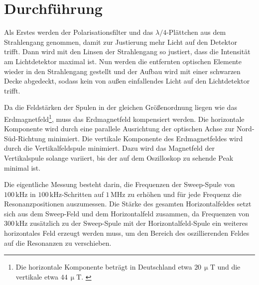 \section{Durchführung}
Als Erstes werden der Polarisationsfilter und das $\lambda/4$-Plättchen aus dem Strahlengang genommen, damit zur Justierung mehr Licht auf den Detektor trifft.
Dann wird mit den Linsen der Strahlengang so justiert, dass die Intensität am Lichtdetektor maximal ist.
Nun werden die entfernten optischen Elemente wieder in den Strahlengang gestellt und der
Aufbau wird mit einer schwarzen Decke abgedeckt, sodass kein von außen
einfallendes Licht auf den Lichtdetektor trifft.

Da die Feldstärken der Spulen in der gleichen Größenordnung liegen wie das
Erdmagnetfeld\footnote{Die horizontale Komponente beträgt in Deutschland etwa
 $20\,\upmu\text{T}$ und die vertikale etwa $44\,\upmu\text{T}$. \cite{erdmagnetfeld}},
 muss das Erdmagnetfeld kompensiert werden. Die horizontale Komponente
 wird durch eine parallele Ausrichtung der optischen Achse zur Nord-Süd-Richtung minimiert.
 Die vertikale Komponente des Erdmagnetfeldes wird durch die Vertikalfeldspule minimiert.
 Dazu wird das Magnetfeld der Vertikalspule solange variiert, bis der auf dem Oszilloskop zu sehende Peak minimal ist.

 Die eigentliche Messung besteht darin, die Frequenzen der Sweep-Spule von  $100\,\text{kHz}$ in $100\,\text{kHz}$-Schritten auf $1\,\text{MHz}$ zu
 erhöhen und für jede Frequenz die Resonanzpositionen auszumessen.
 Die Stärke des gesamten Horizontalfeldes setzt sich aus dem Sweep-Feld und dem Horizontalfeld zusammen, da Frequenzen von
 $300\,\text{kHz}$ zusätzlich zu der Sweep-Spule mit der Horizontalfeld-Spule ein weiteres horizontales Feld erzeugt werden muss,
 um den Bereich des oszillierenden Feldes auf die Resonanzen zu verschieben.
